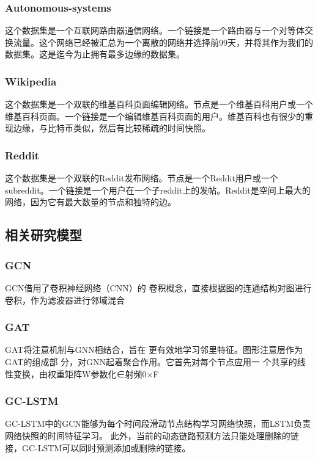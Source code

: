 \documentclass[conference]{IEEEtran}
\begin{document}
\subsubsection{Autonomous-systems}
这个数据集是一个互联网路由器通信网络。一个链接是一个路由器与一个对等体交换流量。这个网络已经被汇总为一个离散的网络并选择前99天，并将其作为我们的数据集。这是迄今为止拥有最多边缘的数据集。

\subsubsection{Wikipedia}
这个数据集是一个双联的维基百科页面编辑网络。节点是一个维基百科用户或一个维基百科页面。一个链接是一个编辑维基百科页面的用户。维基百科也有很少的重现边缘，与比特币类似，然后有比较稀疏的时间快照。

\subsubsection{Reddit}
这个数据集是一个双联的Reddit发布网络。节点是一个Reddit用户或一个subreddit。一个链接是一个用户在一个子reddit上的发帖。Reddit是空间上最大的网络，因为它有最大数量的节点和独特的边。


\subsection{相关研究模型}
\subsubsection{GCN}
GCN\cite{kipf2016semi}借用了卷积神经网络（CNN）的 卷积概念，直接根据图的连通结构对图进行卷积，作为滤波器进行邻域混合

\subsubsection{GAT}
GAT\cite{velivckovic2017graph}将注意机制与GNN相结合，旨在 更有效地学习邻里特征。图形注意层作为GAT的组成部 分，对GNN起着聚合作用。它首先对每个节点应用一 个共享的线性变换，由权重矩阵W参数化∈射频0×F

\subsubsection{GC-LSTM}
GC-LSTM\cite{chen2018gc}中的GCN能够为每个时间段滑动节点结构学习网络快照，而LSTM负责网络快照的时间特征学习。
此外，当前的动态链路预测方法只能处理删除的链接，GC-LSTM可以同时预测添加或删除的链接。
\end{document}

